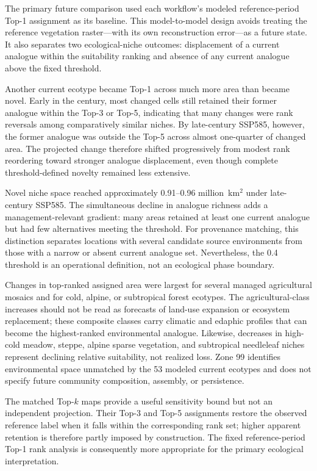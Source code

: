 \documentclass[11pt]{article}
\begin{document}
The primary future comparison used each workflow's modeled reference-period
Top-1 assignment as its baseline. This model-to-model design avoids treating
the reference vegetation raster---with its own reconstruction error---as a
future state. It also separates two ecological-niche outcomes: displacement of
a current analogue within the suitability ranking and absence of any current
analogue above the fixed threshold.

Another current ecotype became Top-1 across much more area than became novel.
Early in the century, most changed cells still retained their former analogue
within the Top-3 or Top-5, indicating that many changes were rank reversals
among comparatively similar niches. By late-century SSP585, however, the
former analogue was outside the Top-5 across almost one-quarter of changed
area. The projected change therefore shifted progressively from modest rank
reordering toward stronger analogue displacement, even though complete
threshold-defined novelty remained less extensive.

Novel niche space reached approximately 0.91--0.96 million~km$^2$ under
late-century SSP585. The simultaneous decline in analogue richness adds a
management-relevant gradient: many areas retained at least one current
analogue but had few alternatives meeting the threshold. For provenance
matching, this distinction separates locations with several candidate source
environments from those with a narrow or absent current analogue set.
Nevertheless, the 0.4 threshold is an operational definition, not an ecological
phase boundary.

Changes in top-ranked assigned area were largest for several managed
agricultural mosaics and for cold, alpine, or subtropical forest ecotypes. The
agricultural-class increases should not be read as forecasts of land-use
expansion or ecosystem replacement; these composite classes carry climatic and
edaphic profiles that can become the highest-ranked environmental analogue.
Likewise, decreases in high-cold meadow, steppe, alpine sparse vegetation, and
subtropical needleleaf niches represent declining relative suitability, not
realized loss. Zone 99 identifies environmental space unmatched by the 53
modeled current ecotypes and does not specify future community composition,
assembly, or persistence.

The matched Top-$k$ maps provide a useful sensitivity bound but not an
independent projection. Their Top-3 and Top-5 assignments restore the observed
reference label when it falls within the corresponding rank set; higher
apparent retention is therefore partly imposed by construction. The fixed
reference-period Top-1 rank analysis is consequently more appropriate for the
primary ecological interpretation.
\end{document}
